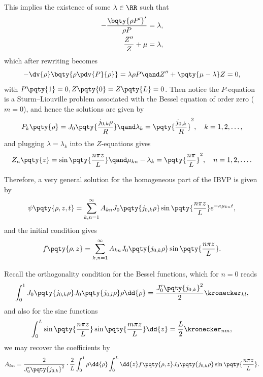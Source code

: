 {This implies the existence of some \(\lambda \in \RR\) such that
\begin{subequations}
    \begin{align}
        - \frac{\bqty{\rho P'}'}{\rho P} &= \lambda, \\
        \frac{Z''}{Z} + \mu &= \lambda,
    \end{align}
\end{subequations}
which after rewriting becomes
\begin{equation}
    - \dv{\rho} \bqty{\rho \pdv{P}{\rho}} = \lambda \rho P \qand Z'' + \pqty{\mu - \lambda} Z = 0,
\end{equation}
with \(P\pqty{1} = 0, Z\pqty{0} = Z\pqty{L} = 0\). Then notice the \(P\)-equation is a Sturm--Liouville problem associated with the Bessel equation of order zero (\(m = 0\)), and hence the solutions are given by
\begin{equation}
    P_k\pqty{\rho} = J_0 \pqty{\frac{j_{0, k} \rho}{R}} \qand \lambda_k = \pqty{\frac{j_{0, k}}{R}}^2, \quad k = 1, 2, \ldots,
\end{equation}
and plugging \(\lambda = \lambda_k\) into the \(Z\)-equations gives
\begin{equation}
    Z_n\pqty{z} = \sin \pqty{\frac{n \pi z}{L}} \qand \mu_{kn} - \lambda_k = \pqty{\frac{n \pi}{L}}^2, \quad n = 1, 2, \ldots.
\end{equation}

Therefore, a very general solution for the homogeneous part of the IBVP is given by
\begin{equation}
    \psi\pqty{\rho, z, t} = \sum_{k, n = 1}^{\infty} A_{kn} J_0 \pqty{j_{0, k} \rho} \sin \pqty{\frac{n \pi z}{L}} e^{- \kappa \mu_{kn} t},
\end{equation}
and the initial condition gives
\begin{equation}
    f\pqty{\rho, z} = \sum_{k, n = 1}^{\infty} A_{kn} J_0 \pqty{j_{0, k} \rho} \sin \pqty{\frac{n \pi z}{L}}.
\end{equation}

Recall the orthogonality condition for the Bessel functions, which for \(n = 0\) reads
\begin{equation}
    \int_{0}^{1} J_0 \pqty{j_{0, k} \rho} J_0 \pqty{j_{0, l} \rho} \rho \dd{\rho} = \frac{J_0' \pqty{j_{0, k}}^2}{2} \kronecker_{kl},
\end{equation}
and also for the sine functions
\begin{equation}
    \int_{0}^{L} \sin \pqty{\frac{n \pi z}{L}} \sin \pqty{\frac{m \pi z}{L}} \dd{z} = \frac{L}{2} \kronecker_{nm},
\end{equation}
we may recover the coefficients by
\begin{equation}
    A_{kn} = \frac{2}{J_0' \pqty{j_{0, k}}^2} \cdot \frac{2}{L} \int_{0}^{1} \rho \dd{\rho} \int_{0}^{L} \dd{z} f\pqty{\rho, z} J_0 \pqty{j_{0, k} \rho} \sin \pqty{\frac{n \pi z}{L}}.
\end{equation}

}
